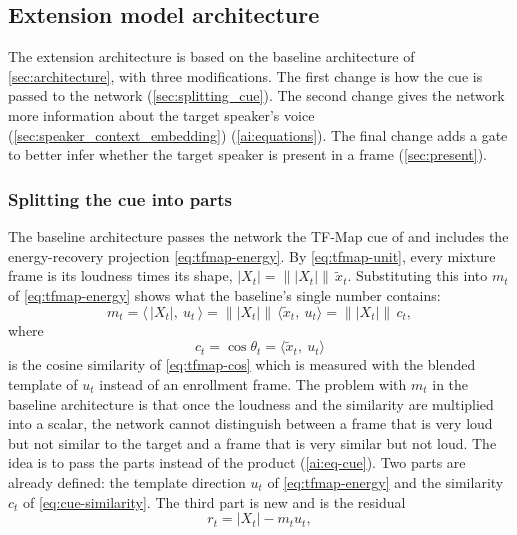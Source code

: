 \subsection{Extension model architecture}
\label{sec:e_architecture}
The extension architecture is based on the baseline architecture of \autoref{sec:architecture}, with three modifications. The first change is how the cue is passed to the network (\autoref{sec:splitting_cue}). The second change gives the network more information about the target speaker's voice (\autoref{sec:speaker_context_embedding}) (\ref{ai:equations}). The final change adds a gate to better infer whether the target speaker is present in a frame (\autoref{sec:present}). 
\subsubsection{Splitting the cue into parts}
\label{sec:splitting_cue}
The baseline architecture passes the network the TF-Map cue of \cite{zhang2025multi} and includes the energy-recovery projection \eqref{eq:tfmap-energy}. By \eqref{eq:tfmap-unit}, every mixture frame is its loudness times its shape,
  $|X_t| = \big\lVert |X_t| \big\rVert\,\tilde{x}_t$. Substituting this into $m_t$ of \eqref{eq:tfmap-energy} shows what the baseline's
  single number contains:
  \begin{equation}
    m_t = \big\langle\, |X_t|,\ u_t \,\big\rangle
        = \big\lVert |X_t| \big\rVert \, \big\langle \tilde{x}_t,\ u_t \big\rangle
        = \big\lVert |X_t| \big\rVert \, c_t ,
    \label{eq:matched-level}
  \end{equation}
  where 
  \begin{equation}
    c_t = \cos\theta_t = \big\langle \tilde{x}_t,\ u_t \big\rangle
    \label{eq:cue-similarity}
  \end{equation}
is the cosine similarity of \eqref{eq:tfmap-cos} which is measured with the blended template of $u_t$ instead of an enrollment frame. The problem with $m_t$ in the baseline architecture is that once the loudness and the similarity are multiplied into a scalar, the network cannot distinguish between a frame that is very loud but not similar to the target and a frame that is very similar but not loud. The idea is to pass the parts instead of the product (\ref{ai:eq-cue}). Two parts are already defined: the template direction $u_t$ of \eqref{eq:tfmap-energy} and the similarity $c_t$ of \eqref{eq:cue-similarity}. The third part is new and is the residual
\begin{equation}
  r_t = |X_t| - m_t u_t,
  \label{eq:cue-residual}
\end{equation}
